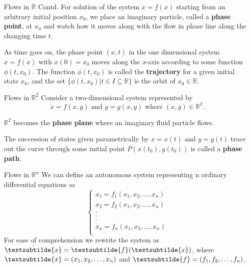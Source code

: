 \documentclass[18pt]{beamer}
\begin{document}
\begin{frame}{Flows in $\mathbb{R}$ Contd.}
    For solution of the system $\dot{x} = f(x)$ starting from an arbitrary initial position $x_0$, we place an imaginary particle, called a \textbf{phase point}, at $x_0$ and watch how it moves along with the flow in phase line along the changing time $t$. 
        \pause{}

        As time goes on, the phase point $(x,t)$ in the one dimensional system $\dot{x} = f(x)$ with $x(0) = x_0$ moves along the \textit{x}-axis according to some function $\phi(t, x_0)$. The function $\phi(t, x_0)$ is called the \textbf{trajectory} for a given initial state $x_0$, and the set $\{\phi(t, x_0) | t \in I \subseteq \mathbb{R}\}$ is the orbit of $x_0 \in \mathbb{R}$.
\end{frame}

\begin{frame}{Flows in $\mathbb{R}^{2}$}
    Consider a two-dimensional system represented by
    \[\dot{x} = f(x,y) \text{ and } \dot{y} = g(x,y) \text{ where } (x,y) \in \mathbb{R}^{2} \text{.}\]

    $\mathbb{R}^{2}$ becomes the \textbf{phase plane} where an imaginary fluid particle flows.
    \pause{}

    \begin{definition}
        The succession of states given parametrically by $x = x(t)$ and $y = y(t)$ trace out the curve through some initial point $P(x(t_0), y(t_0))$ is called a \textbf{phase path}.
    \end{definition}
\end{frame}

\begin{frame}{Flows in $\mathbb{R}^{n}$}
    We can define an autonomous system representing n ordinary differential equations as
    \begin{equation}
        \begin{cases}
            \dot{x}_1 = f_1(x_1, x_2, \ldots , x_n)\\
            \dot{x}_2 = f_2(x_1, x_2, \ldots , x_n)\\
            .\\
            .\\
            .\\
            \dot{x}_n = f_n(x_1, x_2, \ldots , x_n)\\
        \end{cases}
    \end{equation}
    \pause{}
    For ease of comprehension we rewrite the system as $\dot{\textsubtilde{x}} = \textsubtilde{f}(\textsubtilde{x})$, where $\textsubtilde{x} = (x_1, x_2, \ldots , x_n)$ and $\textsubtilde{f} = (f_1, f_2, \ldots, f_n)$.
\end{frame}
\end{document}
